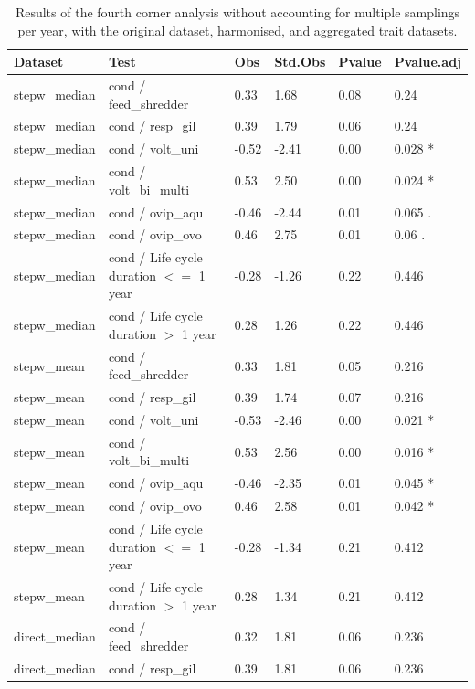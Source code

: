 \documentclass[12pt]{article}
\begin{document}
\begin{longtable}[H]{m{2.6cm}|m{7.3cm}|m{1cm}|m{1.4cm}|m{1.5cm}|m{1.5cm}}
    \caption{Results of the fourth corner analysis without accounting for multiple samplings per year, with the original dataset, harmonised, and aggregated trait datasets.}
    \label{stab:fc_selected_full}
    \endfirsthead
    \toprule[.1em]
    Dataset & Test & Obs & Std.Obs & Pvalue & Pvalue.adj \\ 
    \toprule[.1em]
      stepw\_median & cond / feed\_shredder & 0.33 & 1.68 & 0.08 & 0.24 \\ 
      stepw\_median & cond / resp\_gil & 0.39 & 1.79 & 0.06 & 0.24 \\ 
      stepw\_median & cond / volt\_uni & -0.52 & -2.41 & 0.00 & 0.028 * \\ 
      stepw\_median & cond / volt\_bi\_multi & 0.53 & 2.50 & 0.00 & 0.024 * \\ 
      stepw\_median & cond / ovip\_aqu & -0.46 & -2.44 & 0.01 & 0.065 . \\ 
      stepw\_median & cond / ovip\_ovo & 0.46 & 2.75 & 0.01 & 0.06 . \\ 
      stepw\_median & cond / Life cycle duration $<=$ 1 year & -0.28 & -1.26 & 0.22 & 0.446 \\ 
      stepw\_median & cond / Life cycle duration $>$ 1 year & 0.28 & 1.26 & 0.22 & 0.446 \\ 
      \midrule
      stepw\_mean & cond / feed\_shredder & 0.33 & 1.81 & 0.05 & 0.216 \\ 
      stepw\_mean & cond / resp\_gil & 0.39 & 1.74 & 0.07 & 0.216 \\ 
      stepw\_mean & cond / volt\_uni & -0.53 & -2.46 & 0.00 & 0.021 * \\ 
      stepw\_mean & cond / volt\_bi\_multi & 0.53 & 2.56 & 0.00 & 0.016 * \\ 
      stepw\_mean & cond / ovip\_aqu & -0.46 & -2.35 & 0.01 & 0.045 * \\ 
      stepw\_mean & cond / ovip\_ovo & 0.46 & 2.58 & 0.01 & 0.042 * \\ 
      stepw\_mean & cond / Life cycle duration $<=$ 1 year & -0.28 & -1.34 & 0.21 & 0.412 \\ 
      stepw\_mean & cond / Life cycle duration $>$ 1 year & 0.28 & 1.34 & 0.21 & 0.412 \\
      \midrule 
      direct\_median & cond / feed\_shredder & 0.32 & 1.81 & 0.06 & 0.236 \\ 
      direct\_median & cond / resp\_gil & 0.39 & 1.81 & 0.06 & 0.236 \\ 

\end{longtable}
\end{document}
